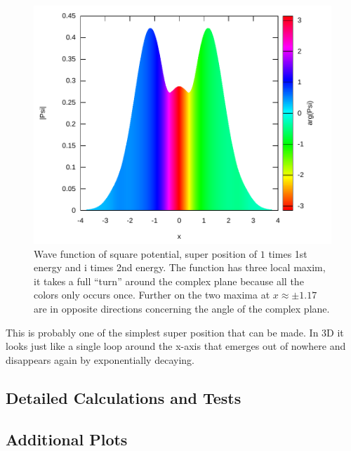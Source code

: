 \documentclass[11pt,DIV=10,final]{scrreprt} %
\newcommand{\mi}{{\text{i}}}
\begin{document}
{\begin{minipage}{\textwidth}
\begin{figure}[H]
\centering
\includegraphics[width=\textwidth]{plots/super-square-1_1-2_i.pdf}
\caption{\label{fig:label} Wave function of square potential, super position of $1$ times 1st energy and $\mi$ times 2nd energy. The function has three local maxim, it takes a full ``turn'' around
    the complex plane because all the colors only occurs once. Further on the two maxima at $x \approx \pm 1.17$ are in opposite directions concerning the angle of the complex plane.}
\end{figure}
This is probably one of the simplest super position that can be made. In 3D it looks just like a single loop around the x-axis that emerges out of nowhere and disappears again by exponentially decaying.

\end{minipage}



\begin{appendix} %
%

\chapter{Detailed Calculations and Tests}
\section{Additional Plots}

\end{appendix}}
\end{document}
